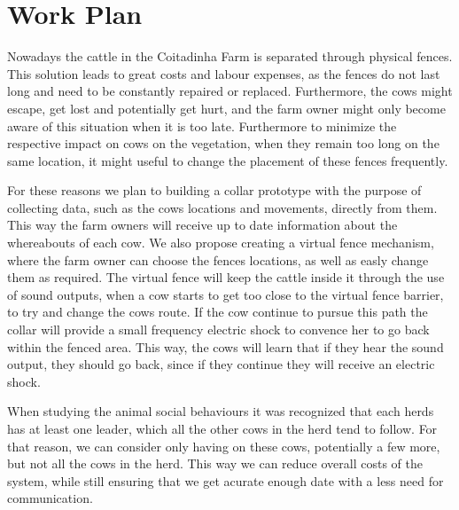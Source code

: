 
%

\chapter{Work Plan}
\label{cha:work_plan}

Nowadays the cattle in the Coitadinha Farm is separated through physical fences. This solution
leads to great costs and labour expenses, as the fences do not last long and need to be constantly
repaired or replaced. Furthermore, the cows might escape, get lost and potentially get hurt, and the farm
owner might only become aware of this situation when it is too late.
Furthermore to minimize the respective impact on cows on the vegetation, when they remain too
long on the same location, it might useful to change the placement of these fences frequently.

For these reasons we plan to building a collar prototype with the purpose of collecting data,
such as the cows locations and movements, directly from them. This way the farm owners will
receive up to date information about the whereabouts of each cow. We also propose creating a
virtual fence mechanism, where the farm owner can choose the fences locations, as well as
easly change them as required. The virtual fence will keep the cattle inside it through the use of
sound outputs, when a cow starts to get too close to the virtual fence barrier, to try and change
the cows route. If the cow continue to pursue this path the collar will provide a small
frequency electric shock to convence her to go back within the fenced area. This way, the cows will learn that if
they hear the sound output, they should go back, since if they continue they will receive an electric shock.

When studying the animal social behaviours it was recognized that each herds has at least one
leader, which all the other cows in the herd tend to follow. For that reason, we can consider only having
 on these cows, potentially a few more, but not all the cows in the herd. This
way we can reduce overall costs of the system, while still ensuring that we get acurate enough
date with a less need for communication.


